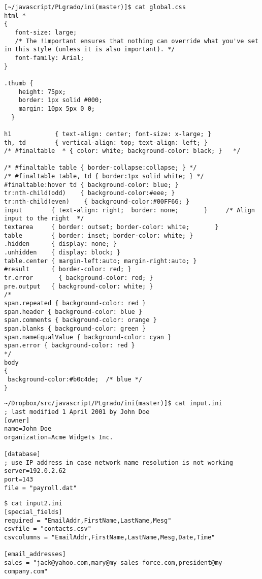 \begin{verbatim}
[~/javascript/PLgrado/ini(master)]$ cat global.css 
html *
{
   font-size: large; 
   /* The !important ensures that nothing can override what you've set in this style (unless it is also important). */
   font-family: Arial;
}

.thumb {
    height: 75px;
    border: 1px solid #000;
    margin: 10px 5px 0 0;
  }

h1            { text-align: center; font-size: x-large; }
th, td        { vertical-align: top; text-align: left; }   
/* #finaltable  * { color: white; background-color: black; }   */

/* #finaltable table { border-collapse:collapse; } */
/* #finaltable table, td { border:1px solid white; } */
#finaltable:hover td { background-color: blue; } 
tr:nth-child(odd)    { background-color:#eee; }
tr:nth-child(even)    { background-color:#00FF66; }
input        { text-align: right;  border: none;       }     /* Align input to the right  */
textarea     { border: outset; border-color: white;       }                        
table        { border: inset; border-color: white; }
.hidden      { display: none; }
.unhidden    { display: block; }
table.center { margin-left:auto; margin-right:auto; }
#result      { border-color: red; }
tr.error       { background-color: red; }
pre.output   { background-color: white; }
/*
span.repeated { background-color: red }
span.header { background-color: blue }
span.comments { background-color: orange }
span.blanks { background-color: green }
span.nameEqualValue { background-color: cyan }
span.error { background-color: red }
*/
body
{
 background-color:#b0c4de;  /* blue */
}
\end{verbatim}


\begin{verbatim}
~/Dropbox/src/javascript/PLgrado/ini(master)]$ cat input.ini 
; last modified 1 April 2001 by John Doe
[owner]
name=John Doe
organization=Acme Widgets Inc.

[database]
; use IP address in case network name resolution is not working
server=192.0.2.62     
port=143
file = "payroll.dat"
\end{verbatim}

\begin{verbatim}
$ cat input2.ini 
[special_fields] 
required = "EmailAddr,FirstName,LastName,Mesg" 
csvfile = "contacts.csv" 
csvcolumns = "EmailAddr,FirstName,LastName,Mesg,Date,Time" 

[email_addresses] 
sales = "jack@yahoo.com,mary@my-sales-force.com,president@my-company.com"
\end{verbatim}


